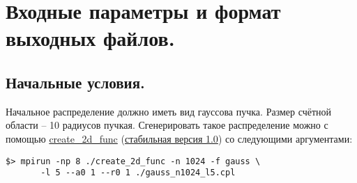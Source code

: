 \section{Входные параметры и формат выходных файлов.}
\label{sec:detailed_description}


\subsection{Начальные условия.}
Начальное распределение должно иметь вид гауссова пучка. Размер счётной области -- 10 радиусов пучкая.
Сгенерировать такое распределение можно с помощью \href{http://github.com/Sannis/create_2d_func/}{create\_2d\_func}
(\href{http://github.com/Sannis/create_2d_func/tarball/v1.0}{стабильная версия 1.0}) со следующими аргументами:
\begin{verbatim}
$> mpirun -np 8 ./create_2d_func -n 1024 -f gauss \
       -l 5 --a0 1 --r0 1 ./gauss_n1024_l5.cpl
\end{verbatim}



